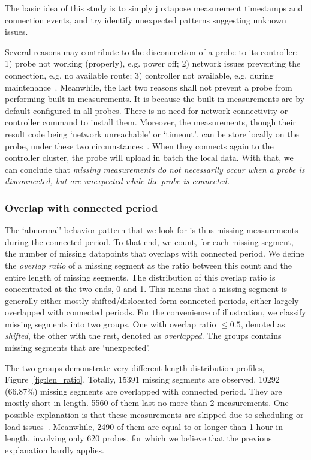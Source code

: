 The basic idea of this study is to simply juxtapose measurement timestamps and connection events, and try identify unexpected patterns suggesting unknown issues.

Several reasons may contribute to the disconnection of a probe to its controller: 1) probe not working (properly), e.g. power off; 2) network issues preventing the connection, e.g. no available route; 3) controller not available, e.g. during maintenance~\cite{controller}. 
Meanwhile, the last two reasons shall not prevent a probe from performing built-in measurements.
It is because the built-in measurements are by default configured in all probes.
There is no need for network connectivity or controller command to install them.
Moreover, the measurements, though their result code being `network unreachable' or `timeout', can be store locally on the probe, under these two circumstances~\cite{usb}.
When they connects again to the controller cluster, the probe will upload in batch the local data.
With that, we can conclude that \textit{missing measurements do not necessarily occur when a probe is disconnected, but are unexpected while the probe is connected.}

\subsubsection{Overlap with connected period}
The `abnormal' behavior pattern that we look for is thus missing measurements during the connected period.
To that end, we count, for each missing segment, the number of missing datapoints that overlaps with connected period.
We define the \textit{overlap ratio} of a missing segment as the ratio between this count and the entire length of missing segments. 
The distribution of this overlap ratio is concentrated at the two ends, 0 and 1. 
This means that a missing segment is generally either mostly shifted/dislocated form connected periods, either largely overlapped with connected periods.
For the convenience of illustration, we classify missing segments into two groups.
One with overlap ratio $\leq0.5$, denoted as \textit{shifted}, the other with the rest, denoted as \textit{overlapped}.
The  groups contains missing segments that are `unexpected'.

The two groups demonstrate very different length distribution profiles, Figure~\ref{fig:len_ratio}.
Totally, 15391 missing segments are observed. 
10292 (66.87\%) missing segments are overlapped with connected period. 
They are mostly short in length. 5560 of them last no more than 2 measurements. 
One possible explanation is that these measurements are skipped due to scheduling or load issues~\cite{schedule, Holterbach2015a}.
Meanwhile, 2490 of them are equal to or longer than 1 hour in length, involving only 620 probes, for which we believe that the previous explanation hardly applies.

